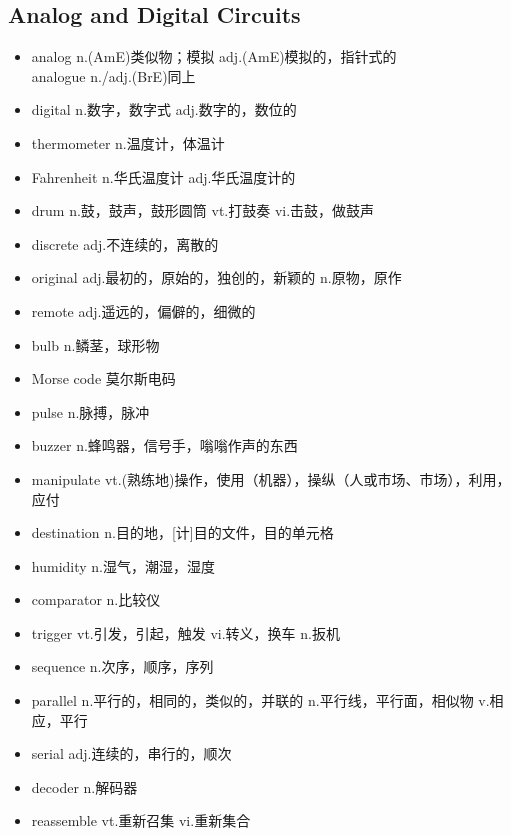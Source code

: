 \subsection{Analog and Digital Circuits}
\begin{multicols}{2}
    \begin{itemize}
        \item analog n.(AmE)类似物；模拟 adj.(AmE)模拟的，指针式的\\analogue n./adj.(BrE)同上
        \item digital n.数字，数字式 adj.数字的，数位的
        \item thermometer n.温度计，体温计
        \item Fahrenheit n.华氏温度计 adj.华氏温度计的
        \item drum n.鼓，鼓声，鼓形圆筒 vt.打鼓奏 vi.击鼓，做鼓声
        \item discrete adj.不连续的，离散的
        \item original adj.最初的，原始的，独创的，新颖的 n.原物，原作
        \item remote adj.遥远的，偏僻的，细微的
        \item bulb n.鳞茎，球形物
        \item Morse code 莫尔斯电码
        \item pulse n.脉搏，脉冲
        \item buzzer n.蜂鸣器，信号手，嗡嗡作声的东西
        \item manipulate vt.(熟练地)操作，使用（机器），操纵（人或市场、市场），利用，应付
        \item destination n.目的地，[计]目的文件，目的单元格
        \item humidity n.湿气，潮湿，湿度
        \item comparator n.比较仪
        \item trigger vt.引发，引起，触发 vi.转义，换车 n.扳机
        \item sequence n.次序，顺序，序列
        \item parallel n.平行的，相同的，类似的，并联的 n.平行线，平行面，相似物 v.相应，平行
        \item serial adj.连续的，串行的，顺次
        \item decoder n.解码器
        \item reassemble vt.重新召集 vi.重新集合
    \end{itemize}
\end{multicols}

